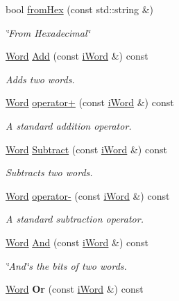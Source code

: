 \begin{DoxyCompactItemize}
bool \hyperlink{classWord_a4e26eb82e8f7426dd46be2bbec9e41c5}{fromHex} (const std::string \&)
\begin{DoxyCompactList}\small\item\em \char`\"{}From Hexadecimal\char`\"{} \item\end{DoxyCompactList}\item 
\hyperlink{classWord}{Word} \hyperlink{classWord_a5cb9115a6cee6666e88390e56eb32071}{Add} (const \hyperlink{classiWord}{iWord} \&) const 
\begin{DoxyCompactList}\small\item\em Adds two words. \item\end{DoxyCompactList}\item 
\hyperlink{classWord}{Word} \hyperlink{classWord_a88e945efd81d13e15adb1ed9e4e95a5a}{operator+} (const \hyperlink{classiWord}{iWord} \&) const 
\begin{DoxyCompactList}\small\item\em A standard addition operator. \item\end{DoxyCompactList}\item 
\hyperlink{classWord}{Word} \hyperlink{classWord_a3ef457fb6f6ce54f5e98a83db4ae4472}{Subtract} (const \hyperlink{classiWord}{iWord} \&) const 
\begin{DoxyCompactList}\small\item\em Subtracts two words. \item\end{DoxyCompactList}\item 
\hyperlink{classWord}{Word} \hyperlink{classWord_a9ec270f103a3a755bd7b627e4b899bb4}{operator-\/} (const \hyperlink{classiWord}{iWord} \&) const 
\begin{DoxyCompactList}\small\item\em A standard subtraction operator. \item\end{DoxyCompactList}\item 
\hyperlink{classWord}{Word} \hyperlink{classWord_a4e1926ab5f4af7b63ec1bf4fadf873ad}{And} (const \hyperlink{classiWord}{iWord} \&) const 
\begin{DoxyCompactList}\small\item\em \char`\"{}And\char`\"{}s the bits of two words. \item\end{DoxyCompactList}\item 
\hypertarget{classWord_aa8645b9198fac6d0833b32503db6e18a}{
\hyperlink{classWord}{Word} {\bfseries Or} (const \hyperlink{classiWord}{iWord} \&) const }
\label{classWord_aa8645b9198fac6d0833b32503db6e18a}


\end{DoxyCompactItemize}
